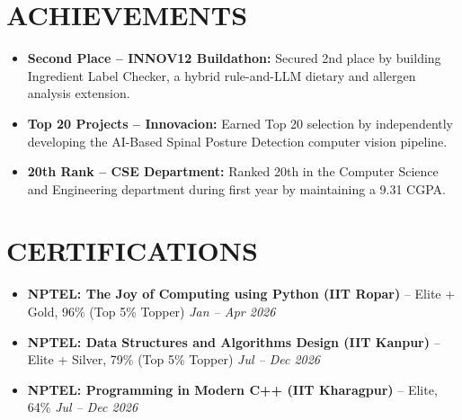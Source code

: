 \documentclass[10pt, a4paper]{article}
\begin{document}
\section{ACHIEVEMENTS}
\begin{itemize}[leftmargin=*, noitemsep, topsep=1pt, parsep=0pt]
    \item \textbf{Second Place -- INNOV12 Buildathon:} Secured 2nd place by building Ingredient Label Checker, a hybrid rule-and-LLM dietary and allergen analysis extension.
    \item \textbf{Top 20 Projects -- Innovacion:} Earned Top 20 selection by independently developing the AI-Based Spinal Posture Detection computer vision pipeline.
    \item \textbf{20th Rank -- CSE Department:} Ranked 20th in the Computer Science and Engineering department during first year by maintaining a 9.31 CGPA.
\end{itemize}

\section{CERTIFICATIONS}
\begin{itemize}[leftmargin=*, noitemsep, topsep=1pt, parsep=0pt]
    \item \textbf{NPTEL: The Joy of Computing using Python (IIT Ropar)} -- Elite + Gold, 96\% (Top 5\% Topper) \hfill \textit{Jan -- Apr 2026}
    \item \textbf{NPTEL: Data Structures and Algorithms Design (IIT Kanpur)} -- Elite + Silver, 79\% (Top 5\% Topper) \hfill \textit{Jul -- Dec 2026}
    \item \textbf{NPTEL: Programming in Modern C++ (IIT Kharagpur)} -- Elite, 64\% \hfill \textit{Jul -- Dec 2026}
\end{itemize}
\end{document}
